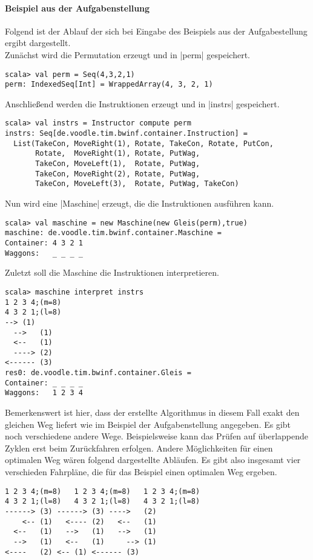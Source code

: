 \paragraph{Beispiel aus der Aufgabenstellung}
Folgend ist der Ablauf der sich bei Eingabe des Beispiels aus der Aufgabestellung ergibt dargestellt. \\
Zunächst wird die Permutation erzeugt und in |perm| gespeichert.
\begin{lstlisting}
scala> val perm = Seq(4,3,2,1)               
perm: IndexedSeq[Int] = WrappedArray(4, 3, 2, 1)
\end{lstlisting}
Anschließend werden die Instruktionen erzeugt und in |instrs| gespeichert.
\begin{lstlisting}
scala> val instrs = Instructor compute perm
instrs: Seq[de.voodle.tim.bwinf.container.Instruction] =
  List(TakeCon, MoveRight(1), Rotate, TakeCon, Rotate, PutCon,
       Rotate,  MoveRight(1), Rotate, PutWag,
       TakeCon, MoveLeft(1),  Rotate, PutWag,
       TakeCon, MoveRight(2), Rotate, PutWag,
       TakeCon, MoveLeft(3),  Rotate, PutWag, TakeCon)
\end{lstlisting}
Nun wird eine |Maschine| erzeugt, die die Instruktionen ausführen kann.
\begin{lstlisting}
scala> val maschine = new Maschine(new Gleis(perm),true)
maschine: de.voodle.tim.bwinf.container.Maschine = 
Container: 4 3 2 1
Waggons:   _ _ _ _
\end{lstlisting}
Zuletzt soll die Maschine die Instruktionen interpretieren.
\begin{lstlisting}
scala> maschine interpret instrs                        
1 2 3 4;(m=8)
4 3 2 1;(l=8)
-->	(1)
  -->	(1)
  <--	(1)
  ---->	(2)
<------	(3)
res0: de.voodle.tim.bwinf.container.Gleis = 
Container: _ _ _ _
Waggons:   1 2 3 4
\end{lstlisting}
Bemerkenswert ist hier, dass der erstellte Algorithmus in diesem Fall exakt den gleichen Weg liefert wie im Beispiel der Aufgabenstellung angegeben.
Es gibt noch verschiedene andere Wege.
Beispielsweise kann das Prüfen auf überlappende Zyklen erst beim Zurückfahren erfolgen.
Andere Möglichkeiten für einen optimalen Weg wären folgend dargestellte Abläufen.
Es gibt also insgesamt vier verschieden Fahrpläne, die für das Beispiel einen optimalen Weg ergeben.
\begin{lstlisting}                   
1 2 3 4;(m=8)	1 2 3 4;(m=8)	1 2 3 4;(m=8)
4 3 2 1;(l=8)	4 3 2 1;(l=8)	4 3 2 1;(l=8)
------>	(3)	------>	(3)	---->	(2)
    <--	(1)	  <----	(2)	  <--	(1)
  <--	(1)	  -->	(1)	  -->	(1)
  -->	(1)	  <--	(1)	    -->	(1)
<----	(2)	<--	(1)	<------	(3)
\end{lstlisting}
\newpage
